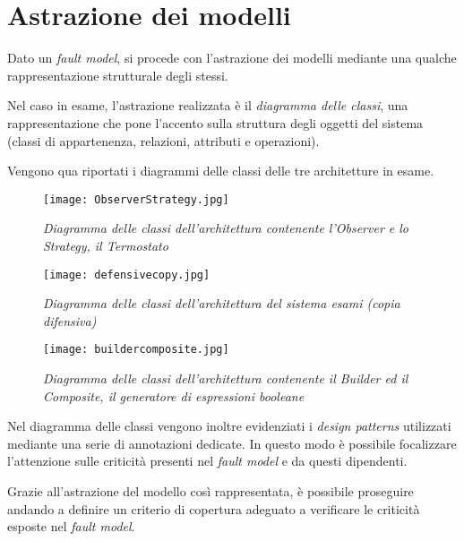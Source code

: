 \chapter{Astrazione dei modelli}

Dato un \emph{fault model}, si procede con l'astrazione dei modelli mediante una qualche rappresentazione strutturale degli stessi.

Nel caso in esame, l'astrazione realizzata è il \emph{diagramma delle classi}, una rappresentazione che pone l'accento sulla struttura degli oggetti del sistema (classi di appartenenza, relazioni, attributi e operazioni).

Vengono qua riportati i diagrammi delle classi delle tre architetture in esame.

\begin{figure}[h] 
  \centering
    \texttt{[image: ObserverStrategy.jpg]}
    \caption{{\small \textit{Diagramma delle classi dell'architettura contenente l'Observer e lo Strategy, il Termostato}}}
\end{figure}

\begin{figure}[h] 
  \centering
    \texttt{[image: defensivecopy.jpg]}
    \caption{{\small \textit{Diagramma delle classi dell'architettura del sistema esami (copia difensiva)}}}
\end{figure}

\begin{figure}[h] 
  \centering
    \texttt{[image: buildercomposite.jpg]}
    \caption{{\small \textit{Diagramma delle classi dell'architettura contenente il Builder ed il Composite, il generatore di espressioni booleane}}}
\end{figure}

Nel diagramma delle classi vengono inoltre evidenziati i \emph{design patterns} utilizzati mediante una serie di annotazioni dedicate. In questo modo è possibile focalizzare l'attenzione sulle criticità presenti nel \emph{fault model } e da questi dipendenti.

Grazie all'astrazione del modello così rappresentata, è possibile proseguire andando a definire un criterio di copertura adeguato a verificare le criticità esposte nel \emph{fault model}.

